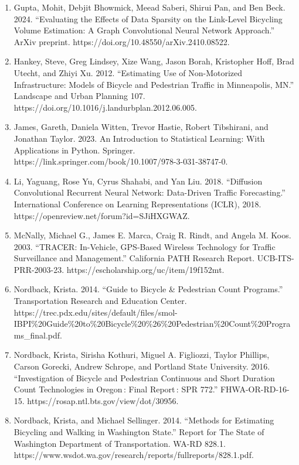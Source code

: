 \documentclass[11pt]{article}
\begin{document}
\begin{enumerate}
\item
  Gupta, Mohit, Debjit Bhowmick, Meead Saberi, Shirui Pan, and Ben Beck.
  2024. ``Evaluating the Effects of Data Sparsity on the Link-Level
  Bicycling Volume Estimation: A Graph Convolutional Neural Network
  Approach.'' ArXiv preprint. https://doi.org/10.48550/arXiv.2410.08522.
\item
  Hankey, Steve, Greg Lindsey, Xize Wang, Jason Borah, Kristopher Hoff,
  Brad Utecht, and Zhiyi Xu. 2012. ``Estimating Use of Non-Motorized
  Infrastructure: Models of Bicycle and Pedestrian Traffic in
  Minneapolis, MN.'' Landscape and Urban Planning 107.
  https://doi.org/10.1016/j.landurbplan.2012.06.005.
\item
  James, Gareth, Daniela Witten, Trevor Hastie, Robert Tibshirani, and
  Jonathan Taylor. 2023. An Introduction to Statistical Learning: With
  Applications in Python. Springer.
  https://link.springer.com/book/10.1007/978-3-031-38747-0.
\item
  Li, Yaguang, Rose Yu, Cyrus Shahabi, and Yan Liu. 2018. ``Diffusion
  Convolutional Recurrent Neural Network: Data-Driven Traffic
  Forecasting.'' International Conference on Learning Representations
  (ICLR), 2018. https://openreview.net/forum?id=SJiHXGWAZ.
\item
  McNally, Michael G., James E. Marca, Craig R. Rindt, and Angela M.
  Koos. 2003. ``TRACER: In-Vehicle, GPS-Based Wireless Technology for
  Traffic Surveillance and Management.'' California PATH Research
  Report. UCB-ITS-PRR-2003-23.
  https://escholarship.org/uc/item/19f152mt.
\item
  Nordback, Krista. 2014. ``Guide to Bicycle \& Pedestrian Count
  Programs.'' Transportation Research and Education Center.
  https://trec.pdx.edu/sites/default/files/smol-IBPI\%20Guide\%20to\%20Bicycle\%20\%26\%20Pedestrian\%20Count\%20Programs\_final.pdf.
\item
  Nordback, Krista, Sirisha Kothuri, Miguel A. Figliozzi, Taylor
  Phillips, Carson Gorecki, Andrew Schrope, and Portland State
  University. 2016. ``Investigation of Bicycle and Pedestrian Continuous
  and Short Duration Count Technologies in Oregon\,: Final Report\,: SPR
  772.'' FHWA-OR-RD-16-15. https://rosap.ntl.bts.gov/view/dot/30956.
\item
  Nordback, Krista, and Michael Sellinger. 2014. ``Methods for
  Estimating Bicycling and Walking in Washington State.'' Report for The
  State of Washington Department of Transportation. WA-RD 828.1.
  https://www.wsdot.wa.gov/research/reports/fullreports/828.1.pdf.

\end{enumerate}
\end{document}
